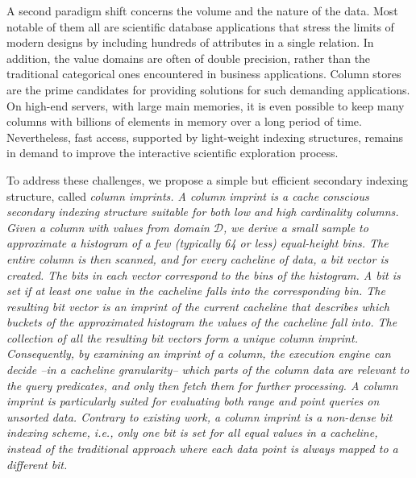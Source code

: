A second paradigm shift concerns the volume and the nature of the data. Most
notable of them all are scientific database applications that stress the limits
of modern designs by including hundreds of attributes in a single relation. In
addition, the value domains are often of double precision, rather than the
traditional categorical ones encountered in business applications.
Column stores are the prime candidates for providing solutions for such
demanding applications. On high-end servers, with large main memories, it is
even possible to keep many columns with billions of elements in memory over a
long period of time. Nevertheless, fast access, supported by light-weight
indexing structures, remains in demand to improve the interactive scientific
exploration process.

To address these challenges, we propose a simple but efficient secondary
indexing structure, called \it{column imprints}. A column imprint is a cache
conscious secondary indexing structure suitable for both low and high
cardinality columns. Given a column with values from domain $\mathcal{D}$, we
derive a small sample to approximate a histogram of a few (typically 64 or
less) equal-height bins. The entire column is then scanned, and for every
cacheline of data, a bit vector is created. The bits in each vector correspond
to the bins of the histogram. A bit is set if at least one value in the
cacheline falls into the corresponding bin. The resulting bit vector is an
\it{imprint} of the current cacheline that describes which buckets of the
approximated histogram the values of the cacheline fall into. The collection of
all the resulting bit vectors form a unique \it{column imprint}. Consequently,
by examining an imprint of a column, the execution engine can decide --in
a cacheline granularity-- which parts of the column data are relevant to the
query predicates, and only then fetch them for further processing. A column
imprint is particularly suited for evaluating both range and point queries on
unsorted data. Contrary to existing work, a column imprint is a \it{non-dense}
bit indexing scheme, i.e., only one bit is set for all equal values in a
cacheline, instead of the traditional approach where each data point is always
mapped to a different bit.

